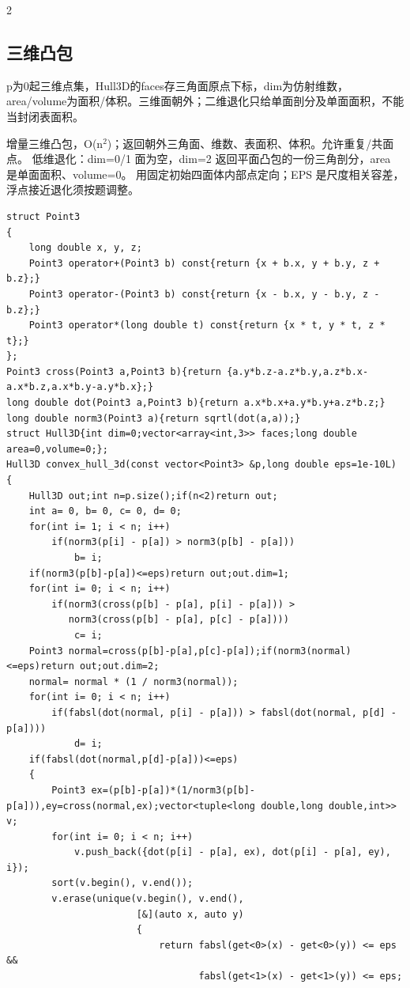 \documentclass[UTF8,fontset=fandol,a4paper,twoside]{ctexart}
\newcommand{\note}[1]{{\fontsize{10}{12}\selectfont #1\par}}
\begin{document}
\begin{multicols}{2}
\subsection{三维凸包}

\note{p为0起三维点集，Hull3D的faces存三角面原点下标，dim为仿射维数，area/\allowbreak{}volume为面积/\allowbreak{}体积。三维面朝外；二维退化只给单面剖分及单面面积，不能当封闭表面积。}
\note{增量三维凸包，O(\allowbreak{}n\ensuremath{^2})\allowbreak{}；返回朝外三角面、维数、表面积、体积。允许重复/\allowbreak{}共面点。 低维退化：dim=\allowbreak{}0/\allowbreak{}1 面为空，dim=\allowbreak{}2 返回平面凸包的一份三角剖分，area 是单面面积、volume=\allowbreak{}0。 用固定初始四面体内部点定向；EPS 是尺度相关容差，浮点接近退化须按题调整。}
\begin{lstlisting}
struct Point3
{
    long double x, y, z;
    Point3 operator+(Point3 b) const{return {x + b.x, y + b.y, z + b.z};}
    Point3 operator-(Point3 b) const{return {x - b.x, y - b.y, z - b.z};}
    Point3 operator*(long double t) const{return {x * t, y * t, z * t};}
};
Point3 cross(Point3 a,Point3 b){return {a.y*b.z-a.z*b.y,a.z*b.x-a.x*b.z,a.x*b.y-a.y*b.x};}
long double dot(Point3 a,Point3 b){return a.x*b.x+a.y*b.y+a.z*b.z;}
long double norm3(Point3 a){return sqrtl(dot(a,a));}
struct Hull3D{int dim=0;vector<array<int,3>> faces;long double area=0,volume=0;};
Hull3D convex_hull_3d(const vector<Point3> &p,long double eps=1e-10L)
{
    Hull3D out;int n=p.size();if(n<2)return out;
    int a= 0, b= 0, c= 0, d= 0;
    for(int i= 1; i < n; i++)
        if(norm3(p[i] - p[a]) > norm3(p[b] - p[a]))
            b= i;
    if(norm3(p[b]-p[a])<=eps)return out;out.dim=1;
    for(int i= 0; i < n; i++)
        if(norm3(cross(p[b] - p[a], p[i] - p[a])) >
           norm3(cross(p[b] - p[a], p[c] - p[a])))
            c= i;
    Point3 normal=cross(p[b]-p[a],p[c]-p[a]);if(norm3(normal)<=eps)return out;out.dim=2;
    normal= normal * (1 / norm3(normal));
    for(int i= 0; i < n; i++)
        if(fabsl(dot(normal, p[i] - p[a])) > fabsl(dot(normal, p[d] - p[a])))
            d= i;
    if(fabsl(dot(normal,p[d]-p[a]))<=eps)
    {
        Point3 ex=(p[b]-p[a])*(1/norm3(p[b]-p[a])),ey=cross(normal,ex);vector<tuple<long double,long double,int>> v;
        for(int i= 0; i < n; i++)
            v.push_back({dot(p[i] - p[a], ex), dot(p[i] - p[a], ey), i});
        sort(v.begin(), v.end());
        v.erase(unique(v.begin(), v.end(),
                       [&](auto x, auto y)
                       {
                           return fabsl(get<0>(x) - get<0>(y)) <= eps &&
                                  fabsl(get<1>(x) - get<1>(y)) <= eps;

\end{lstlisting}
\end{multicols}
\end{document}
